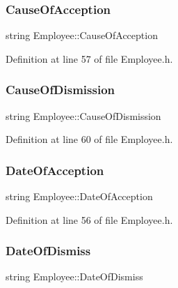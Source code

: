 \subsubsection{\texorpdfstring{Cause\+Of\+Acception}{CauseOfAcception}}
{\footnotesize\ttfamily string Employee\+::\+Cause\+Of\+Acception\hspace{0.3cm}{\ttfamily [private]}}



Definition at line 57 of file Employee.\+h.

\mbox{\label{class_employee_a80bd5a84291a0369521af1dcfecca970}} 
\subsubsection{\texorpdfstring{Cause\+Of\+Dismission}{CauseOfDismission}}
{\footnotesize\ttfamily string Employee\+::\+Cause\+Of\+Dismission\hspace{0.3cm}{\ttfamily [private]}}



Definition at line 60 of file Employee.\+h.

\mbox{\label{class_employee_a4b6f93cebcc5e3bb343f89d65467c4d2}} 
\subsubsection{\texorpdfstring{Date\+Of\+Acception}{DateOfAcception}}
{\footnotesize\ttfamily string Employee\+::\+Date\+Of\+Acception\hspace{0.3cm}{\ttfamily [private]}}



Definition at line 56 of file Employee.\+h.

\mbox{\label{class_employee_a1402b4d32163d3fca601082052d2ff80}} 
\subsubsection{\texorpdfstring{Date\+Of\+Dismiss}{DateOfDismiss}}
{\footnotesize\ttfamily string Employee\+::\+Date\+Of\+Dismiss\hspace{0.3cm}{\ttfamily [private]}}



